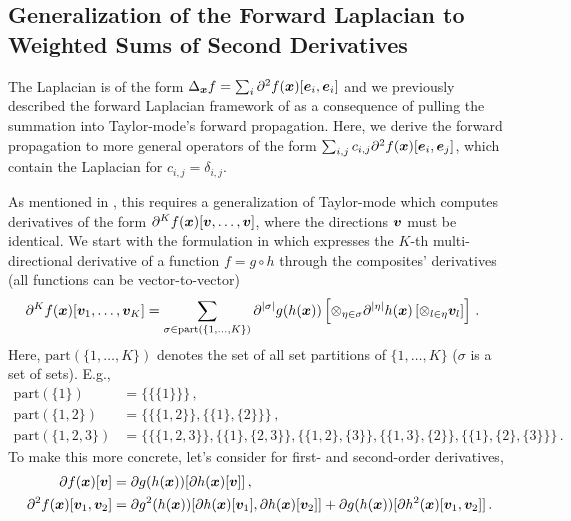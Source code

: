 \subsection{Generalization of the Forward Laplacian to Weighted Sums of Second Derivatives}\label{sec:generalized-forward-laplacian}
The Laplacian is of the form $\Delta_{{\bm{x}}}f = \sum_{i} \partial^2f({\bm{x}})[{\bm{e}}_i, {\bm{e}}_i]$ and we previously described the forward Laplacian framework of \citet{li2023forward} as a consequence of pulling the summation into Taylor-mode's forward propagation.
Here, we derive the forward propagation to more general operators of the form $\sum_{i,j} c_{i,j} \partial^2f({\bm{x}})[{\bm{e}}_i, {\bm{e}}_j]$, which contain the Laplacian for $c_{i,j} = \delta_{i,j}$.

As mentioned in , this requires a generalization of Taylor-mode which computes derivatives of the form $\partial^K f({\bm{x}}) [{\bm{v}}, \dots, {\bm{v}}]$, where the directions ${\bm{v}}$ must be identical. We start with the formulation in \cite{johnson2021taylor-made} which expresses the $K$-th multi-directional derivative of a function $f = g \circ h$ through the composites' derivatives (all functions can be vector-to-vector)
\begin{align}
  \label{eq:taylor-mode-multi-directional}
  \partial^K f({\bm{x}})[{\bm{v}}_1, \dots, {\bm{v}}_K]
  & =
    \sum_{\sigma \in \mathrm{part}(\{1, \dots, K\})}
    \partial^{|\sigma|}g(h({\bm{x}}))
    \left[
    \otimes_{\eta \in \sigma} \partial^{|\eta|}h({\bm{x}}) \left[ \otimes_{l \in \eta} {\bm{v}}_l \right]
    \right]
  \,.
\end{align}
Here, $\mathrm{part}(\{1, \dots, K\})$ denotes the set of all set partitions of $\{1, \dots, K\}$ ($\sigma$ is a set of sets). E.g.,
\begin{align*}
  \mathrm{part}(\{1\})
  &=
    \{
    \{ \{1 \} \}
    \}\,,
  \\
  \mathrm{part}(\{1,2\})
  &=
    \{
    \{ \{1,2\} \}, \{ \{1\}, \{2\} \}
    \}\,,
  \\
  \mathrm{part}(\{1,2,3\})
  &=
    \{
    \{ \{1,2,3\} \},
    \{ \{1\}, \{2,3\} \},
    \{ \{1,2\}, \{3\} \},
    \{ \{1,3\}, \{2\} \},
    \{ \{1\}, \{2\}, \{3\} \}
    \}\,.
\end{align*}
To make this more concrete, let's consider  for first- and second-order derivatives,
\begin{subequations}\label{eq:taylor-mode-multi-directional-1-2}
  \begin{align}
    \partial f({\bm{x}}) [{\bm{v}}]
    &=
      \partial g(h({\bm{x}})) [\partial h({\bm{x}}) [{\bm{v}}]]\,,
    \\  \label{subeq:taylor-mode-multi-directional-1-2}
    \partial^2 f({\bm{x}}) [{\bm{v}}_1, {\bm{v}}_2]
    &=
      \partial g^2(h({\bm{x}})) [\partial h({\bm{x}}) [{\bm{v}}_1], \partial h({\bm{x}}) [{\bm{v}}_2]]
      +
      \partial g(h({\bm{x}})) [\partial h^2({\bm{x}}) [{\bm{v}}_1, {\bm{v}}_2]]\,.
  \end{align}
\end{subequations}

